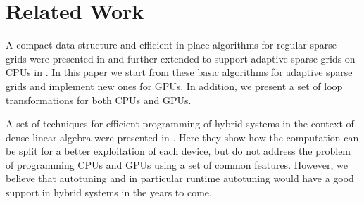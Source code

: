 \section{Related Work}
A compact data structure and efficient in-place algorithms for regular sparse
grids were presented in \cite{murarasu2011} and further extended to support
adaptive sparse grids on CPUs in \cite{murarasu2012}. In this paper we start
from these basic algorithms for adaptive sparse grids and implement new ones for
GPUs. In addition, we present a set of loop transformations for both CPUs and
GPUs.

A set of techniques for efficient programming of hybrid systems in the context
of dense linear algebra were presented in \cite{Tomov:2010:TDL:1805333.1805388}.
Here they show how the computation can be split for a better exploitation of
each device, but do not address the problem of programming CPUs and GPUs using a
set of common features. However, we believe that autotuning and in particular
runtime autotuning would have a good support in hybrid systems in the years to
come.


